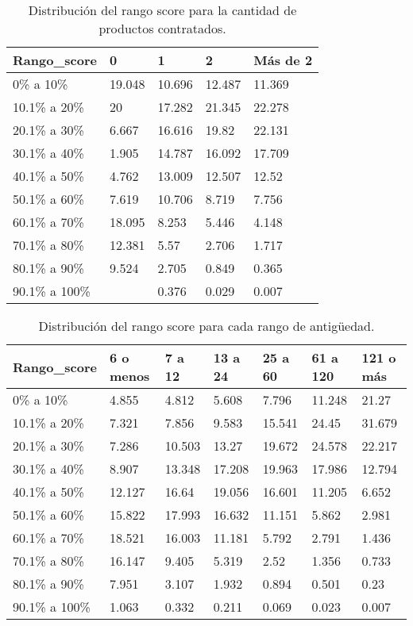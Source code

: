 \documentclass[../main.tex]{subfiles}
\begin{document}
\begin{table}[htb]
    \centering
    \begin{tabular}{lllll}
        \hline
        Rango\_score   & 0      & 1      & 2      & Más de 2 \\ \hline
        0\% a 10\%     & 19.048 & 10.696 & 12.487 & 11.369   \\
        10.1\% a 20\%  & 20     & 17.282 & 21.345 & 22.278   \\
        20.1\% a 30\%  & 6.667  & 16.616 & 19.82  & 22.131   \\
        30.1\% a 40\%  & 1.905  & 14.787 & 16.092 & 17.709   \\
        40.1\% a 50\%  & 4.762  & 13.009 & 12.507 & 12.52    \\
        50.1\% a 60\%  & 7.619  & 10.706 & 8.719  & 7.756    \\
        60.1\% a 70\%  & 18.095 & 8.253  & 5.446  & 4.148    \\
        70.1\% a 80\%  & 12.381 & 5.57   & 2.706  & 1.717    \\
        80.1\% a 90\%  & 9.524  & 2.705  & 0.849  & 0.365    \\
        90.1\% a 100\% &        & 0.376  & 0.029  & 0.007    \\ \hline
    \end{tabular}
    \caption{Distribución del rango score para la cantidad de productos contratados.}
\end{table}
\begin{table}[htb]
    \centering
    \begin{tabular}{lllllll}
        \hline
        Rango\_score   & 6 o menos & 7 a 12 & 13 a 24 & 25 a 60 & 61 a 120 & 121 o más \\ \hline
        0\% a 10\%     & 4.855     & 4.812  & 5.608   & 7.796   & 11.248   & 21.27     \\
        10.1\% a 20\%  & 7.321     & 7.856  & 9.583   & 15.541  & 24.45    & 31.679    \\
        20.1\% a 30\%  & 7.286     & 10.503 & 13.27   & 19.672  & 24.578   & 22.217    \\
        30.1\% a 40\%  & 8.907     & 13.348 & 17.208  & 19.963  & 17.986   & 12.794    \\
        40.1\% a 50\%  & 12.127    & 16.64  & 19.056  & 16.601  & 11.205   & 6.652     \\
        50.1\% a 60\%  & 15.822    & 17.993 & 16.632  & 11.151  & 5.862    & 2.981     \\
        60.1\% a 70\%  & 18.521    & 16.003 & 11.181  & 5.792   & 2.791    & 1.436     \\
        70.1\% a 80\%  & 16.147    & 9.405  & 5.319   & 2.52    & 1.356    & 0.733     \\
        80.1\% a 90\%  & 7.951     & 3.107  & 1.932   & 0.894   & 0.501    & 0.23      \\
        90.1\% a 100\% & 1.063     & 0.332  & 0.211   & 0.069   & 0.023    & 0.007     \\ \hline
    \end{tabular}
    \caption{Distribución del rango score para cada rango de antigüedad.}
\end{table}
\end{document}

